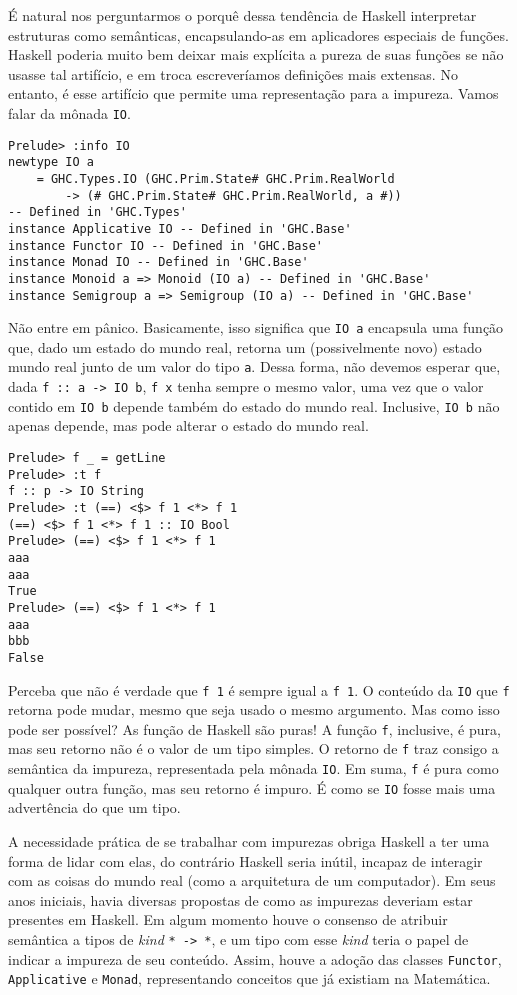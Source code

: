 \documentclass[a4paper]{article}
\begin{document}
É natural nos perguntarmos o porquê dessa tendência de Haskell interpretar estruturas como semânticas, encapsulando-as em aplicadores especiais de funções.
Haskell poderia muito bem deixar mais explícita a pureza de suas funções se não usasse tal artifício, e em troca escreveríamos definições mais extensas.
No entanto, é esse artifício que permite uma representação para a impureza.
Vamos falar da mônada \texttt{IO}.

\begin{verbatim}
Prelude> :info IO
newtype IO a
	= GHC.Types.IO (GHC.Prim.State# GHC.Prim.RealWorld
		-> (# GHC.Prim.State# GHC.Prim.RealWorld, a #))
-- Defined in 'GHC.Types'
instance Applicative IO -- Defined in 'GHC.Base'
instance Functor IO -- Defined in 'GHC.Base'
instance Monad IO -- Defined in 'GHC.Base'
instance Monoid a => Monoid (IO a) -- Defined in 'GHC.Base'
instance Semigroup a => Semigroup (IO a) -- Defined in 'GHC.Base'
\end{verbatim}

Não entre em pânico.
Basicamente, isso significa que \texttt{IO a} encapsula uma função que, dado um estado do mundo real, retorna um (possivelmente novo) estado mundo real junto de um valor do tipo \texttt{a}.
Dessa forma, não devemos esperar que, dada \texttt{f :: a -> IO b}, \texttt{f x} tenha sempre o mesmo valor, uma vez que o valor contido em \texttt{IO b} depende também do estado do mundo real.
Inclusive, \texttt{IO b} não apenas depende, mas pode alterar o estado do mundo real.

\begin{verbatim}
Prelude> f _ = getLine
Prelude> :t f
f :: p -> IO String
Prelude> :t (==) <$> f 1 <*> f 1
(==) <$> f 1 <*> f 1 :: IO Bool
Prelude> (==) <$> f 1 <*> f 1
aaa
aaa
True
Prelude> (==) <$> f 1 <*> f 1
aaa
bbb
False
\end{verbatim}

Perceba que não é verdade que \texttt{f 1} é sempre igual a \texttt{f 1}.
O conteúdo da \texttt{IO} que \texttt{f} retorna pode mudar, mesmo que seja usado o mesmo argumento.
Mas como isso pode ser possível?
As função de Haskell são puras!
A função \texttt{f}, inclusive, é pura, mas seu retorno não é o valor de um tipo simples.
O retorno de \texttt{f} traz consigo a semântica da impureza, representada pela mônada \texttt{IO}.
Em suma, \texttt{f} é pura como qualquer outra função, mas seu retorno é impuro.
É como se \texttt{IO} fosse mais uma advertência do que um tipo.

A necessidade prática de se trabalhar com impurezas obriga Haskell a ter uma forma de lidar com elas, do contrário Haskell seria inútil, incapaz de interagir com as coisas do mundo real (como a arquitetura de um computador).
Em seus anos iniciais, havia diversas propostas de como as impurezas deveriam estar presentes em Haskell.
Em algum momento houve o consenso de atribuir semântica a tipos de \emph{kind} \texttt{* -> *}, e um tipo com esse \emph{kind} teria o papel de indicar a impureza de seu conteúdo.
Assim, houve a adoção das classes \texttt{Functor}, \texttt{Applicative} e \texttt{Monad}, representando conceitos que já existiam na Matemática.
\end{document}
